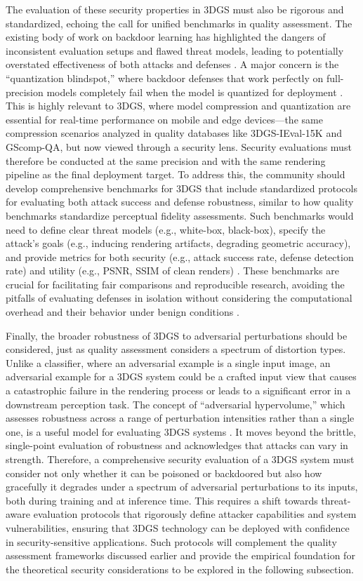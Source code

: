 \documentclass[11pt]{article}
\begin{document}
The evaluation of these security properties in 3DGS must also be rigorous and standardized, echoing the call for unified benchmarks in quality assessment. The existing body of work on backdoor learning has highlighted the dangers of inconsistent evaluation setups and flawed threat models, leading to potentially overstated effectiveness of both attacks and defenses \cite{ref754,ref755}. A major concern is the ``quantization blindspot,'' where backdoor defenses that work perfectly on full-precision models completely fail when the model is quantized for deployment \cite{ref756}. This is highly relevant to 3DGS, where model compression and quantization are essential for real-time performance on mobile and edge devices---the same compression scenarios analyzed in quality databases like 3DGS-IEval-15K and GScomp-QA, but now viewed through a security lens. Security evaluations must therefore be conducted at the same precision and with the same rendering pipeline as the final deployment target. To address this, the community should develop comprehensive benchmarks for 3DGS that include standardized protocols for evaluating both attack success and defense robustness, similar to how quality benchmarks standardize perceptual fidelity assessments. Such benchmarks would need to define clear threat models (e.g., white-box, black-box), specify the attack's goals (e.g., inducing rendering artifacts, degrading geometric accuracy), and provide metrics for both security (e.g., attack success rate, defense detection rate) and utility (e.g., PSNR, SSIM of clean renders) \cite{ref757}. These benchmarks are crucial for facilitating fair comparisons and reproducible research, avoiding the pitfalls of evaluating defenses in isolation without considering the computational overhead and their behavior under benign conditions \cite{ref758}.

Finally, the broader robustness of 3DGS to adversarial perturbations should be considered, just as quality assessment considers a spectrum of distortion types. Unlike a classifier, where an adversarial example is a single input image, an adversarial example for a 3DGS system could be a crafted input view that causes a catastrophic failure in the rendering process or leads to a significant error in a downstream perception task. The concept of ``adversarial hypervolume,'' which assesses robustness across a range of perturbation intensities rather than a single one, is a useful model for evaluating 3DGS systems \cite{ref759}. It moves beyond the brittle, single-point evaluation of robustness and acknowledges that attacks can vary in strength. Therefore, a comprehensive security evaluation of a 3DGS system must consider not only whether it can be poisoned or backdoored but also how gracefully it degrades under a spectrum of adversarial perturbations to its inputs, both during training and at inference time. This requires a shift towards threat-aware evaluation protocols that rigorously define attacker capabilities and system vulnerabilities, ensuring that 3DGS technology can be deployed with confidence in security-sensitive applications. Such protocols will complement the quality assessment frameworks discussed earlier and provide the empirical foundation for the theoretical security considerations to be explored in the following subsection.
\end{document}
